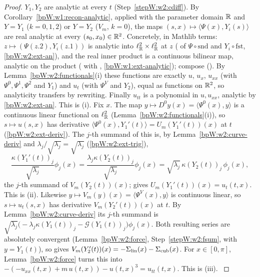 \begin{proof}
\label{stepW:w2:joint}
$Y_1,Y_2$ are analytic at every $t$ (Step~\ref{stepW:w2:cdiff}). By Corollary~\ref{bpW:w1:recon-analytic}, applied with
the parameter domain $\mathbb{R}$ and $Y=Y_1$ ($k=0,1,2$) or $Y=Y_2$ ($V_m$, $k=0$), the maps
$(s,x)\mapsto\langle\Psi(x),Y_i(s)\rangle$ are real analytic at every $(s_0,x_0)\in\mathbb{R}^2$. Concretely, in Mathlib terms:
$z\mapsto(\Psi(z.2),Y_i(z.1))$ is analytic into $\ell^2_{\mathbb{R}}\times\ell^2_{\mathbb{R}}$ at $z$ ( of
$\Psi\circ\mathrm{snd}$ and $Y_i\circ\mathrm{fst}$, \ref{bpW:w2:ext-an}), and the real inner product is a continuous
bilinear map, analytic on the product ( with ,
\ref{bpW:w1:ext-analytic}); compose (). By Lemma~\ref{bpW:w2:functionals}(i) these functions are
exactly $u$, $u_x$, $u_{xx}$ (with $\Psi^0,\Psi^1,\Psi^2$ and $Y_1$) and $u_t$ (with $\Psi^V$ and $Y_2$), equal as
functions on $\mathbb{R}^2$, so analyticity transfers by rewriting. Finally $u_{tt}$ is a polynomial in $u,u_{xx}$, analytic by
\ref{bpW:w2:ext-an}. This is (i).
\label{stepW:w2:t1}
Fix $x$. The map $y\mapsto D^0y(x)=\langle\Psi^0(x),y\rangle$ is a continuous linear functional on $\ell^2_{\mathbb{R}}$
(Lemma~\ref{bpW:w2:functionals}(i)), so $s\mapsto u(s,x)$ has derivative $\langle\Psi^0(x),Y_1'(t)\rangle=
U_m(Y_1'(t))(x)$ at $t$ (\ref{bpW:w2:ext-deriv}). The $j$-th summand of this  is, by
Lemma~\ref{bpW:w2:curve-deriv} and $\lambda_j/\sqrt{\lambda_j}=\sqrt{\lambda_j}$ (\ref{bpW:w2:ext-trig}),
\[\frac{\kappa(Y_1'(t))_j}{\sqrt{\lambda_j}}\phi_j(x)=\frac{\lambda_j\kappa(Y_2(t))_j}{\sqrt{\lambda_j}}\phi_j(x)
=\sqrt{\lambda_j}\,\kappa(Y_2(t))_j\,\phi_j(x),\]
the $j$-th summand of $V_m(Y_2(t))(x)$;  gives $U_m(Y_1'(t))(x)=u_t(t,x)$. This is (ii).
\label{stepW:w2:t2}
Likewise $y\mapsto V_m(y)(x)=\langle\Psi^V(x),y\rangle$ is continuous linear, so $s\mapsto u_t(s,x)$ has derivative
$V_m(Y_2'(t))(x)$ at $t$. By Lemma~\ref{bpW:w2:curve-deriv} its $j$-th summand is
$\sqrt{\lambda_j}\bigl(-\lambda_j\kappa(Y_1(t))_j-\mathcal G(Y_1(t))_j\bigr)\phi_j(x)$. Both resulting series are
absolutely convergent (Lemma~\ref{bpW:w2:force}, Step~\ref{stepW:w2:fsum}, with $y=Y_1(t)$), so
 gives
$V_m(Y_2'(t))(x)=-\Sigma_{\rm lin}(x)-\Sigma_{\rm cub}(x)$. For $x\in[0,\pi]$, Lemma~\ref{bpW:w2:force} turns this into
$-(-u_{xx}(t,x)+m\,u(t,x))-u(t,x)^3=u_{tt}(t,x)$. This is (iii).
\label{stepW:w2:x}

\end{proof}
